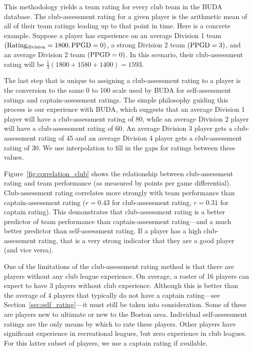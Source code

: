 This methodology yields a team rating for every club team in the BUDA database. The club-assessment rating for a given player is the arithmetic mean of all of their team ratings leading up to that point in time. Here is a concrete example. Suppose a player has experience on an average Division 1 team $({\rm Rating_{division} = 1800}, {\rm PPGD} = 0)$, a strong Division 2 team $({\rm PPGD} = 3)$, and an average Division 2 team $({\rm PPGD} = 0)$. In this scenario, their club-assessment rating will be $\frac{1}{3}(1800 + 1580 + 1400) = 1593$.

The last step that is unique to assigning a club-assessment rating to a player is the conversion to the same 0 to 100 scale used by BUDA for self-assessment ratings and captain-assessment ratings. The simple philosophy guiding this process is our experience with BUDA, which suggests that an average Division 1 player will have a club-assessment rating of 80, while an average Division 2 player will have a club-assessment rating of 60. An average Division 3 player gets a club-assessment rating of 45 and an average Division 4 player gets a club-assessment rating of 30. We use interpolation to fill in the gaps for ratings between these values.

Figure~\ref{fig:correlation_club} shows the relationship between club-assessment rating and team performance (as measured by points per game differential). Club-assessment rating correlates more strongly with team performance than captain-assessment rating ($r = 0.43$ for club-assessment rating, $r = 0.31$ for captain rating). This demonstrates that club-assessment rating is a better predictor of team performance than captain-assessment rating---and a much better predictor than self-assessment rating. If a player has a high club-assessment rating, that is a very strong indicator that they are a good player (and vice versa).

One of the limitations of the club-assessment rating method is that there are players without any club league experience.  On average, a roster of 16 players can expect to have 3 players without club experience. Although this is better than the average of 4 players that typically do not have a captain rating---see Section~\ref{sec:self_rating}---it must still be taken into consideration. Some of these are players new to ultimate or new to the Boston area. Individual self-assessment ratings are the only means by which to rate these players. Other players have significant experience in recreational leagues, but zero experience in club leagues. For this latter subset of players, we use a captain rating if available. 

